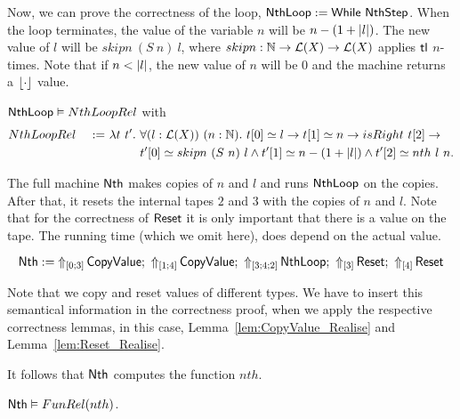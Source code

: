Now, we can prove the correctness of the loop, $\MS{NthLoop} := \While~\MS{NthStep}$.  When the loop terminates, the value of the variable $n$ will be
$n - (1 + \length{l})$.  The new value of $l$ will be $skipn~(S~n)~l$, where $skipn : \Nat \to \List(X) \to \List(X)$ applies $\tl$ $n$-times.  Note
that if $n < \length{l}$, the new value of $n$ will be $0$ and the machine returns a $\Some\cdot$ value.

\begin{lemma}
  \label{lem:Nth_Loop_Realise}
  $\MS{NthLoop} \Realise NthLoopRel$ with
  \begin{alignat*}{2}
    & NthLoopRel &~:=~& \lambda t~t'.~\forall (l:\List(X))~(n:\Nat).~t[0] \simeq l \rightarrow t[1] \simeq n \rightarrow isRight~t[2] \rightarrow \\
    &            &~  ~& \phantom{\lambda t~t'.}~t'[0] \simeq skipn~(S~n)~l \land t'[1] \simeq n-(1+\length{l}) \land t'[2] \simeq nth~l~n.
  \end{alignat*}
\end{lemma}

The full machine $\MS{Nth}$ makes copies of $n$ and $l$ and runs $\MS{NthLoop}$ on the copies.  After that, it resets the internal tapes $2$ and $3$
with the copies of $n$ and $l$.  Note that for the correctness of $\MS{Reset}$ it is only important that there is a value on the tape.  The running time
(which we omit here), does depend on the actual value.
\begin{definition}[$\MS{Nth}$][Nth]
  \[
    \MS{Nth} := \LiftTapes{\MS{CopyValue}}{\Vector{0;3}} \Seq
    \LiftTapes{\MS{CopyValue}}{\Vector{1;4}} \Seq
    \LiftTapes{\MS{NthLoop}}{\Vector{3;4;2}} \Seq
    \LiftTapes{\MS{Reset}}{\Vector{3}} \Seq
    \LiftTapes{\MS{Reset}}{\Vector{4}}
  \]
\end{definition}
Note that we copy and reset values of different types.  We have to insert this semantical information in the correctness proof, when we apply the
respective correctness lemmas, in this case, Lemma~\ref{lem:CopyValue_Realise} and Lemma~\ref{lem:Reset_Realise}.

It follows that $\MS{Nth}$ computes the function $nth$.
\begin{lemma}
  \label{lem:Nth_Computes}
  $\MS{Nth} \Realise FunRel(nth)$.
\end{lemma}



